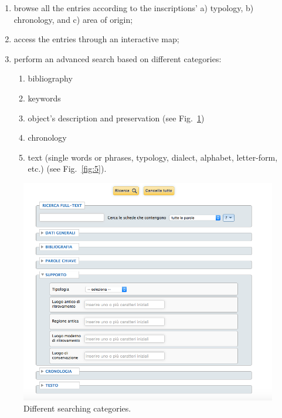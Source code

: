 \documentclass[amsthm,ebook]{saparticle}
\begin{document}
\begin{enumerate}
\item browse all the entries according to the inscriptions’ a) typology, b) chronology, and c) area of origin;
\item access the entries through an interactive map;
\item perform an advanced search based on different categories: 
\begin{enumerate}
\item bibliography
\item keywords
\item object’s description and preservation (see Fig.~\ref{fig:4})
\item chronology
\item text (single words or phrases, typology, dialect, alphabet, letter-form, etc.) (see Fig.~\ref{fig:5}).
\end{enumerate}
\end{enumerate}







\begin{figure}[!bp]
\centering
 \includegraphics[width=\columnwidth]{EAGLE2016FullPaperrevised-img004.png}
\caption{Different searching categories.}
\label{fig:4}
\end{figure}
\end{document}
